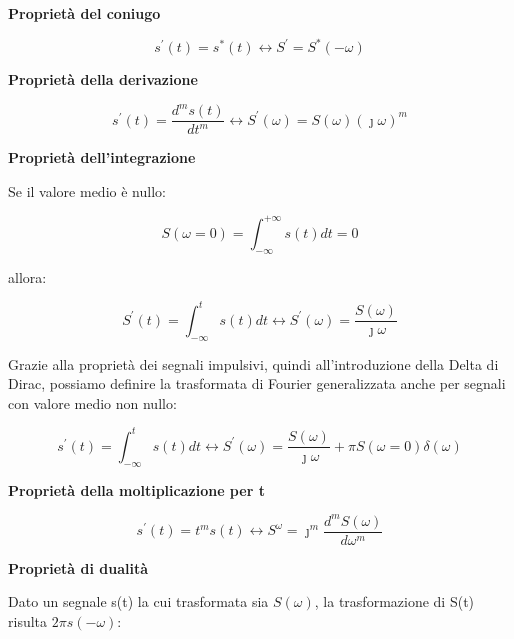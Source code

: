 \textbf{Proprietà del coniugo}

{
    \Large
    \begin{equation}
        s^{'} (t) = s^{*} (t)
        \leftrightarrow 
        S^{'} = S^{*} (-\omega)
    \end{equation}
}

\textbf{Proprietà della derivazione}

{
    \Large
    \begin{equation}
        s^{'} (t) = \frac{d^{m} s(t)}{dt^{m}}
        \leftrightarrow
        S^{'} (\omega) = S(\omega) (\jmath \omega) ^{m}
    \end{equation}
}

\textbf{Proprietà dell'integrazione} 

Se il valore medio è nullo:

{
    \Large 
    \begin{equation} 
        S(\omega = 0) = \int_{- \infty}^{+ \infty} s(t) dt = 0
    \end{equation}
}

allora: 

{
    \Large 
    \begin{equation}
        S^{'} (t) = \int_{- \infty}^{t} s(t) dt 
        \leftrightarrow
        S^{'} (\omega) = \frac{S(\omega)}{\jmath \omega}
    \end{equation}
}

Grazie alla proprietà dei segnali impulsivi, quindi all'introduzione della Delta di Dirac, 
possiamo definire la trasformata di Fourier generalizzata anche per segnali con valore medio non nullo: 

{
    \Large 
    \begin{equation}
        s^{'} (t) = \int_{- \infty}^{t} s(t) dt 
        \leftrightarrow 
        S^{'} (\omega) = \frac{S(\omega)}{\jmath \omega} + \pi S(\omega = 0) \delta(\omega)
    \end{equation}
}

\textbf{Proprietà della moltiplicazione per t}

{
    \Large
    \begin{equation}
        s^{'} (t) = t ^{m} s(t) 
        \leftrightarrow
        S^{\omega} = \jmath ^{m} \frac{d^{m} S(\omega)}{d\omega ^{m}}
    \end{equation}
}

\textbf{Proprietà di dualità}

Dato un segnale s(t) la cui trasformata sia $S(\omega)$, la trasformazione di S(t) risulta 
$2\pi s(-\omega)$: 

